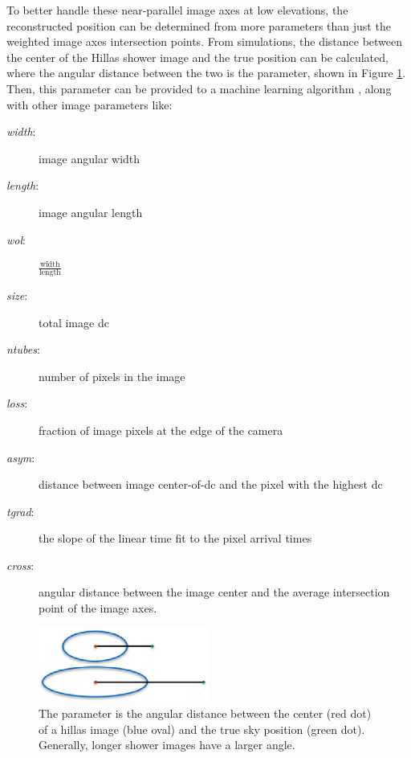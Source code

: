     To better handle these near-parallel image axes at low elevations, the reconstructed position can be determined from more parameters than just the weighted image axes intersection points.
    From simulations, the distance between the center of the Hillas shower image and the true position can be calculated, where the angular distance between the two is the \disp{} parameter\cite{Senturk:2011}, shown in Figure \ref{fig:dispdiagram}.
    Then, this \disp{} parameter can be provided to a machine learning algorithm \cite{Beilicke2012NIM}, along with other image parameters like:
    \begin{description}
      \item[\textit{width}:] image angular width
      \item[\textit{length}:] image angular length
      \item[\textit{wol}:] $\frac{\textrm{width}}{\textrm{length}}$
      \item[\textit{size}:] total image dc
      \item[\textit{ntubes}:] number of pixels in the image
      \item[\textit{loss}:] fraction of image pixels at the edge of the camera
      \item[\textit{asym}:] distance between image center-of-dc and the pixel with the highest dc
      \item[\textit{tgrad}:] the slope of the linear time fit to the pixel arrival times
      \item[\textit{cross}:] angular distance between the image center and the average intersection point of the image axes.
    \end{description}


    \begin{figure}[ht]
      \centering
      \includegraphics[width=0.5\textwidth]{images/disp_parameter_cropped.eps}
      \caption[Angular Reconstruction Disp]{
        The \disp{} parameter is the angular distance between the center (red dot) of a hillas image (blue oval) and the true sky position (green dot).
        Generally, longer shower images have a larger \disp{} angle.
      }
      \label{fig:dispdiagram}
    \end{figure}


